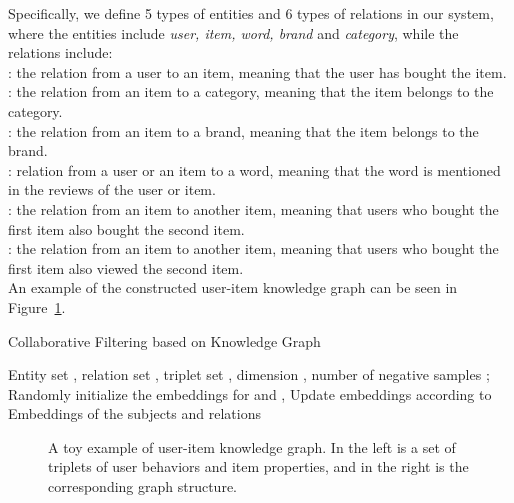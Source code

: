 \documentclass[algorithms,article,accept,moreauthors,pdftex,10pt,a4paper]{Definitions/mdpi}
\begin{document}
Specifically, we define 5 types of entities and 6 types of relations in our system, where the entities include \textit{user, item, word, brand} and \textit{category}, 
while the relations include:\\
 : the relation from a user to an item, meaning that the user has bought the item.\\
 : the relation from an item to a category, meaning that the item belongs to the category.\\
 : the relation from an item to a brand, meaning that the item belongs to the brand.\\
 : relation from a user or an  item to a word, meaning that the word is mentioned in the reviews of the user or item.\\
 : the relation from an item to another item, meaning that users who bought the first item also bought the second item.\\
 : the relation from an item to another item, meaning that users who bought the first item also viewed the second item.\\


An example of the constructed user-item knowledge graph can be seen in Figure~\ref{example}.


\begin{algorithm}[t]
\caption{Collaborative Filtering based on Knowledge Graph}
\label{alg:A}
\begin{algorithmic}
\REQUIRE Entity set , relation set , triplet set , dimension , number of negative samples ;\\
\STATE Randomly initialize the embeddings for  and 
\STATE 
\REPEAT
\STATE ,   
\STATE  
\STATE 
\UNTIL{} 
\STATE Update embeddings according to 
\ENDFOR
\ENSURE Embeddings of the subjects and relations
\end{algorithmic}
\end{algorithm}





\begin{figure}[t!]
	\centering
	\setlength{\fboxrule}{0.pt}
	\setlength{\fboxsep}{0.pt}
	\vspace{-10pt}
	\caption{A toy example of user-item knowledge graph. In the left is a set of triplets of user behaviors and item properties, and in the right is the corresponding  graph structure.}
	\vspace{-15pt}
	\label{example}
\end{figure}
\end{document}
